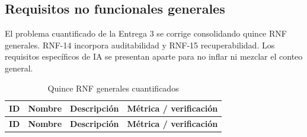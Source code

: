 \documentclass[12pt,a4paper]{article}
\begin{document}
\subsection{Requisitos no funcionales generales}
El problema cuantificado de la Entrega 3 se corrige consolidando quince RNF generales. RNF-14 incorpora auditabilidad y RNF-15 recuperabilidad. Los requisitos específicos de IA se presentan aparte para no inflar ni mezclar el conteo general.
\small
\begin{longtable}{p{}p{}p{}p{}}
\caption{Quince RNF generales cuantificados}\\\toprule
\textbf{ID}&\textbf{Nombre}&\textbf{Descripción}&\textbf{Métrica / verificación}\\\midrule\endfirsthead
\toprule\textbf{ID}&\textbf{Nombre}&\textbf{Descripción}&\textbf{Métrica / verificación}\\\midrule\endhead


\end{longtable}
\end{document}
